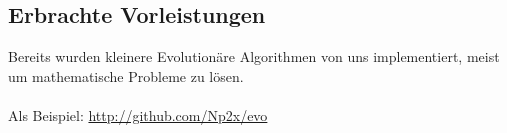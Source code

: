 \subsection{Erbrachte Vorleistungen}
Bereits wurden kleinere Evolutionäre Algorithmen von uns implementiert, meist um mathematische Probleme zu lösen.
\\\\ Als Beispiel: \url{http://github.com/Np2x/evo}